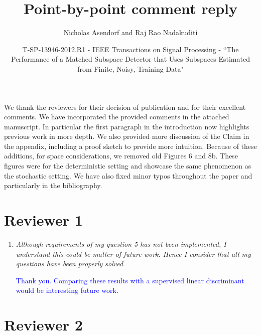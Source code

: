 \documentclass[11pt]{article}
\title{Point-by-point comment reply}
\author{Nicholas Asendorf and Raj Rao Nadakuditi}
\date{T-SP-13946-2012.R1 - IEEE Transactions on Signal Processing - ``The Performance of a Matched Subspace Detector that Uses Subspaces Estimated from Finite, Noisy, Training Data"}
\begin{document}
\maketitle

We thank the reviewers for their decision of publication and for their excellent
comments. We have incorporated the provided comments in the attached manuscript. In
particular the first paragraph in the introduction now highlights previous work in
more depth. We also provided more discussion of the Claim in the appendix, including a
proof sketch to provide more intuition. Because of these additions, for space
considerations, we removed old Figures 6 and 8b. These figures were for the deterministic
setting and showcase the same phenomenon as the stochastic setting. We have also fixed minor typos throughout the
paper and particularly in the bibliography. 

\section*{Reviewer 1}
\begin{enumerate}
\item \textit{Although requirements of my question 5 has not been implemented, I understand this
  could be matter of future work. Hence I consider that all my questions have been
  properly solved}

\textcolor{blue}{Thank you. Comparing these results with a supervised linear discriminant
    would be interesting future work.}
\end{enumerate}

\section*{Reviewer 2}
\end{document}

